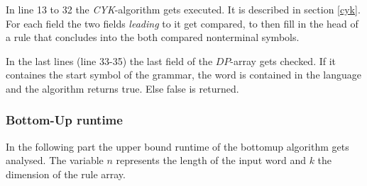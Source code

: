\documentclass[a4paper, 11pt]{article}
\begin{document}
In line 13 to 32 the \textit{CYK}-algorithm gets executed. It is described in section \ref{cyk}. For each field the two fields \textit{leading} to it get compared, to then fill in the head of a rule that concludes into the both compared nonterminal symbols.


In the last lines (line 33-35) the last field of the $DP$-array gets checked. If it containes the start symbol of the grammar, the word is contained in the language and the algorithm returns true. Else false is returned.




\subsubsection{Bottom-Up runtime}
\label{bottomupruntime}

In the following part the upper bound runtime of the bottomup algorithm gets analysed.
The variable $n$ represents the length of the input word and $k$ the dimension of the rule array.
\end{document}
